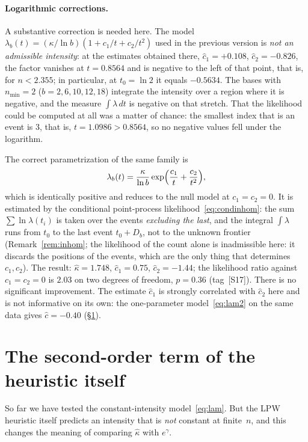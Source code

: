 \documentclass[11pt,a4paper]{article}
\theoremstyle{plain}
\theoremstyle{remark}
\newcommand{\eg}{e^{\gamma}}
\begin{document}
\paragraph{Logarithmic corrections.} A substantive correction is needed here.
The model $\lambda_b(t)=(\kappa/\ln b)(1+c_1/t+c_2/t^2)$ used in the previous
version is \emph{not an admissible intensity}: at the estimates obtained there,
$\hat c_1=+0.108$, $\hat c_2=-0.826$, the factor vanishes at $t=0.8564$ and is
negative to the left of that point, that is, for $n<2.355$; in particular, at
$t_0=\ln 2$ it equals $-0.5634$. The bases with $n_{\min}=2$
($b=2,6,10,12,18$) integrate the intensity over a region where it is negative,
and the measure $\int\lambda\,dt$ is negative on that stretch. That the
likelihood could be computed at all was a matter of chance: the smallest index
that is an event is $3$, that is, $t=1.0986>0.8564$, so no negative values fell
under the logarithm.

The correct parametrization of the same family is
\begin{equation}\label{eq:logcorr}
\lambda_b(t)=\frac{\kappa}{\ln b}\exp\Bigl(\frac{c_1}{t}+\frac{c_2}{t^2}\Bigr),
\end{equation}
which is identically positive and reduces to the null model at $c_1=c_2=0$. It
is estimated by the conditional point-process likelihood~\eqref{eq:condinhom}:
the sum $\sum\ln\lambda(t_i)$ is taken over the events \emph{excluding the last},
and the integral $\int\lambda$ runs from $t_0$ to the last event $t_0+D_b$, not
to the unknown frontier (Remark~\ref{rem:inhom}; the likelihood of the count
alone is inadmissible here: it discards the positions of the events, which are
the only thing that determines $c_1,c_2$). The result: $\hat\kappa=1.748$,
$\hat c_1=0.75$, $\hat c_2=-1.44$; the likelihood ratio against $c_1=c_2=0$ is
$2.03$ on two degrees of freedom, $p=0.36$ (tag~[S17]). There is no significant
improvement. The estimate $\hat c_1$ is strongly correlated with $\hat c_2$ here
and is not informative on its own: the one-parameter model~\eqref{eq:lam2} on the
same data gives $\hat c=-0.40$ (\S\ref{sec:second}).

\section{The second-order term of the heuristic itself}\label{sec:second}

So far we have tested the constant-intensity model~\eqref{eq:lam}. But the LPW
heuristic itself predicts an intensity that is \emph{not} constant at
finite~$n$, and this changes the meaning of comparing $\hat\kappa$ with $\eg$.
\end{document}
